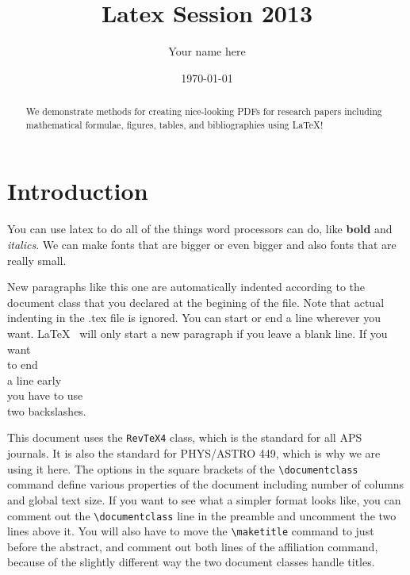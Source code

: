 \documentclass[twocolumn,10 pt,showpacs,preprintnumbers,amsmath,amssymb]{revtex4-1}
\begin{document}
\title{Latex Session 2013}

\author{Your name here}

\date{\today}

\begin{abstract}
  We demonstrate methods for creating nice-looking PDFs for research
  papers including mathematical formulae, figures, tables, and
  bibliographies using \LaTeX !
\end{abstract}

\maketitle

\section{Introduction}

You can use latex to do all of the things word processors can do, like
\textbf{bold} and \textit{italics}.  We can make fonts that are {\Large
bigger} or even {\Huge bigger} and also fonts that are really {\tiny 
small}.

New paragraphs like this one are automatically indented according to the
document class that you declared at the begining of the file.  Note that
actual indenting in the .tex file is ignored.  You can start or end a
line wherever you want.  \LaTeX~ will only start a new paragraph if you
leave a blank line.  If you want\\ to end\\ a line early\\ you have to
use\\ two backslashes.

This document uses the \texttt{Rev\TeX 4} class, which is the standard for
all APS journals. It is also the standard for PHYS/ASTRO 449, which is
why we are using it here. The options in the square brackets of the
\verb_\documentclass_ command define various properties of the document
including number of columns and global text size. If you want to see
what a simpler format looks like, you can comment out the
\verb_\documentclass_ line in the preamble and uncomment the two lines
above it. You will also have to move the \verb_\maketitle_ command to
just before the abstract, and comment out both lines of the affiliation
command, because of the slightly different way the two document classes
handle titles.
\end{document}
